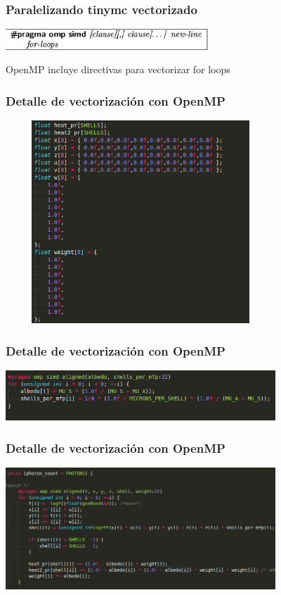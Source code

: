 \documentclass{beamer}
\begin{document}
    \begin{frame}
        \frametitle{Paralelizando tinymc vectorizado}
        \includegraphics[width=3in]{imagenes/omp_vec_1.png}

        OpenMP incluye directivas para vectorizar for loops

    \end{frame}

    \begin{frame}
        \frametitle{Detalle de vectorización con OpenMP}
         \includegraphics[width=4in, height=3in]{imagenes/omp_vec_2.png}
    \end{frame}

    \begin{frame}
        \frametitle{Detalle de vectorización con OpenMP}
        \includegraphics[width=4in]{imagenes/omp_vec_3.png}
    \end{frame}

    \begin{frame}
        \frametitle{Detalle de vectorización con OpenMP}
        \includegraphics[width=4in]{imagenes/omp_vec_4.png}

    \end{frame}
\end{document}
